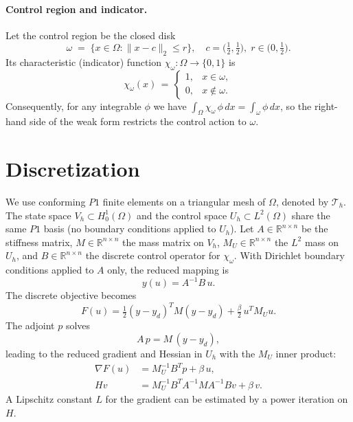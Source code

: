 \documentclass[11pt,a4paper]{article}
\begin{document}
\paragraph{Control region and indicator.}
Let the control region be the closed disk
\begin{equation}
  \omega \;=\; \big\{ x\in\Omega : \|x - c\|_2 \le r \big\},\quad c=\big(\tfrac{1}{2},\tfrac{1}{2}\big),\; r\in\big(0,\tfrac{1}{2}\big).
\end{equation}
Its characteristic (indicator) function $\chi_{\omega}:\Omega\to\{0,1\}$ is
\begin{equation}
  \chi_{\omega}(x) \,=\, \begin{cases}
    1, & x\in \omega, \\
    0, & x\notin \omega.
  \end{cases}
\end{equation}
Consequently, for any integrable $\phi$ we have $\int_{\Omega} \chi_{\omega}\,\phi\,dx = \int_{\omega} \phi\,dx$, so the right-hand side of the weak form restricts the control action to $\omega$.

\section{Discretization}
We use conforming $P1$ finite elements on a triangular mesh of $\Omega$, denoted by $\mathcal{T}_h$. The state space $V_h\subset H_0^1(\Omega)$ and the control space $U_h\subset L^2(\Omega)$ share the same $P1$ basis (no boundary conditions applied to $U_h$). Let $A\in\mathbb{R}^{n\times n}$ be the stiffness matrix, $M\in\mathbb{R}^{n\times n}$ the mass matrix on $V_h$, $M_U\in\mathbb{R}^{n\times n}$ the $L^2$ mass on $U_h$, and $B\in\mathbb{R}^{n\times n}$ the discrete control operator for $\chi_{\omega}$. With Dirichlet boundary conditions applied to $A$ only, the reduced mapping is
\begin{equation}
  y(u) = A^{-1} B\,u.
\end{equation}
The discrete objective becomes
\begin{equation}
  F(u) = \tfrac{1}{2}(y- y_d)^T M (y- y_d) + \tfrac{\beta}{2}\, u^T M_U u.
\end{equation}
The adjoint $p$ solves
\begin{equation}
  A\,p = M\,(y- y_d),
\end{equation}
leading to the reduced gradient and Hessian in $U_h$ with the $M_U$ inner product:
\begin{align}
  \nabla F(u) &= M_U^{-1} B^T p + \beta\,u, \\
  H v &= M_U^{-1} B^T A^{-1} M A^{-1} B v + \beta\, v.
\end{align}
A Lipschitz constant $L$ for the gradient can be estimated by a power iteration on $H$.
\end{document}

